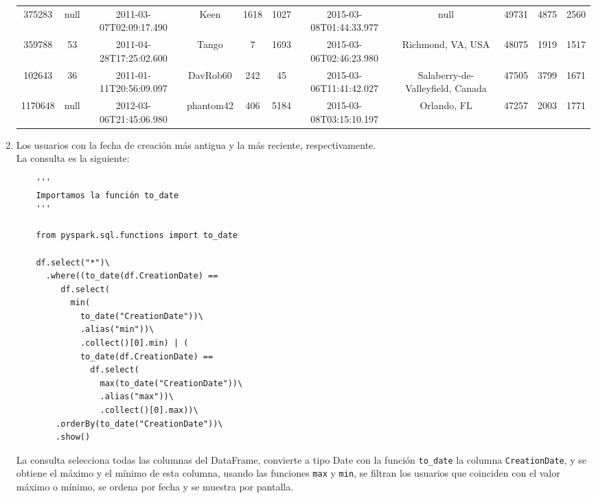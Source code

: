 \documentclass[12pt,a4paper,twoside,openright,titlepage,final]{article}
\begin{document}
\begin{enumerate}
\begin{table}[htbp!]
{\begin{tabular}{@{}ccccccccccc@{}}
			375283             & null         & 2011-03-07T02:09:17.490 & Keen                 & 1618               & 1027        & 2015-03-08T01:44:33.977 & null                             & 49731               & 4875             & 2560           \\
			359788             & 53           & 2011-04-28T17:25:02.600 & Tango                & 7                  & 1693        & 2015-03-06T02:46:23.980 & Richmond, VA, USA                & 48075               & 1919             & 1517           \\
			102643             & 36           & 2011-01-11T20:56:09.097 & DavRob60             & 242                & 45          & 2015-03-06T11:41:42.027 & Salaberry-de-Valleyfield, Canada & 47505               & 3799             & 1671           \\
			1170648            & null         & 2012-03-06T21:45:06.980 & phantom42            & 406                & 5184        & 2015-03-08T03:15:10.197 & Orlando, FL                      & 47257               & 2003             & 1771           \\ \bottomrule
			\end{tabular}%
		}
	\end{table}
		
	\item Los usuarios con la fecha de creación más antigua y la más reciente, respectivamente.\\
	
	La consulta es la siguiente:
	
	\begin{verbatim}
	''' 
	Importamos la función to_date 
	'''
	
	from pyspark.sql.functions import to_date
	
	df.select("*")\
	  .where((to_date(df.CreationDate) ==    
	     df.select(
	       min(
	         to_date("CreationDate"))\
	         .alias("min"))\
	         .collect()[0].min) | (
	         to_date(df.CreationDate) == 
	           df.select(
	             max(to_date("CreationDate"))\
	             .alias("max"))\
	             .collect()[0].max))\
	    .orderBy(to_date("CreationDate"))\
	    .show()
	\end{verbatim}
	
	La consulta selecciona todas las columnas del DataFrame, convierte a tipo Date con la función \texttt{to\_date} la columna \texttt{CreationDate}, y se obtiene el máximo y el mínimo de esta columna, usando las funciones \texttt{max} y \texttt{min}, se filtran los usuarios que coinciden con el valor máximo o mínimo, se ordena por fecha y se muestra por pantalla.\\
	

\end{enumerate}
\end{document}
